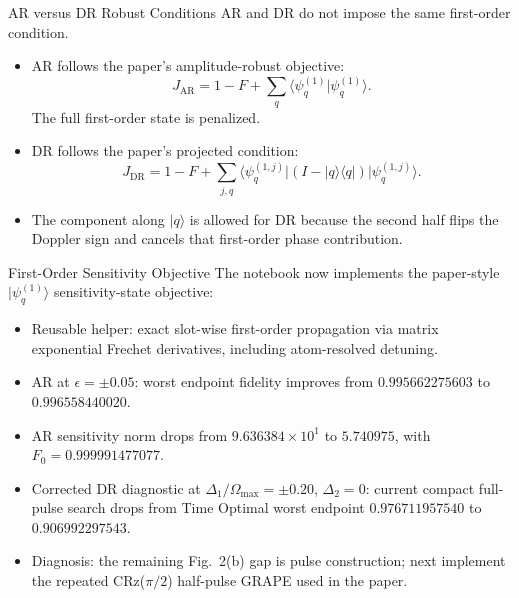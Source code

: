\documentclass[aspectratio=169]{beamer}
\begin{document}
\begin{frame}{AR versus DR Robust Conditions}
  AR and DR do not impose the same first-order condition.
  \begin{itemize}
    \item AR follows the paper's amplitude-robust objective:
      \[
        J_{\mathrm{AR}}=1-F+\sum_q
        \langle\psi_q^{(1)}|\psi_q^{(1)}\rangle .
      \]
      The full first-order state is penalized.
    \item DR follows the paper's projected condition:
      \[
        J_{\mathrm{DR}}=1-F+\sum_{j,q}
        \langle\psi_q^{(1,j)}|
        (I-|q\rangle\langle q|)
        |\psi_q^{(1,j)}\rangle .
      \]
    \item The component along \(|q\rangle\) is allowed for DR because the second half flips the Doppler sign and cancels that first-order phase contribution.
  \end{itemize}
\end{frame}

\begin{frame}{First-Order Sensitivity Objective}
  The notebook now implements the paper-style \(|\psi_q^{(1)}\rangle\) sensitivity-state objective:
  \begin{itemize}
    \item Reusable helper: exact slot-wise first-order propagation via matrix exponential Frechet derivatives, including atom-resolved detuning.
    \item AR at \(\epsilon=\pm0.05\): worst endpoint fidelity improves from \(0.995662275603\) to \(0.996558440020\).
    \item AR sensitivity norm drops from \(9.636384\times10^{1}\) to \(5.740975\), with \(F_0=0.999991477077\).
    \item Corrected DR diagnostic at \(\Delta_1/\Omega_{\max}=\pm0.20\), \(\Delta_2=0\): current compact full-pulse search drops from Time Optimal worst endpoint \(0.976711957540\) to \(0.906992297543\).
    \item Diagnosis: the remaining Fig.~2(b) gap is pulse construction; next implement the repeated CRz(\(\pi/2\)) half-pulse GRAPE used in the paper.
  \end{itemize}
\end{frame}
\end{document}
